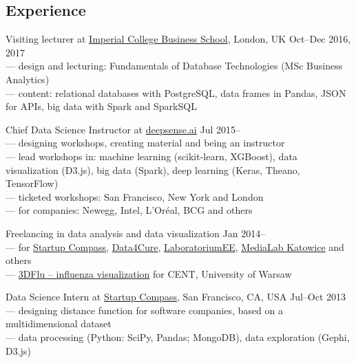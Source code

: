 \documentclass[margin,line]{resume}
\begin{document}
\begin{resume}

    \section{\mysidestyle Experience}

    \begin{list2}

    \item Visiting lecturer at \href{https://wwwf.imperial.ac.uk/business-school/}{Imperial College Business School}, London, UK \hfill Oct--Dec 2016, 2017\\
        --- design and lecturing: Fundamentals of Database Technologies (MSc Business Analytics)\\
        --- content: relational databases with PostgreSQL, data frames in Pandas, JSON for APIs, big data with Spark and SparkSQL

    \item Chief Data Science Instructor at \href{https://deepsense.ai/}{deepsense.ai} \hfill Jul 2015--\\
        --- designing workshops, creating material and being an instructor\\
        --- lead workshops in: machine learning (scikit-learn, XGBoost), data visualization (D3.js), big data (Spark), deep learning (Keras, Theano, TensorFlow)\\
        --- ticketed workshops: San Francisco, New York and London\\
        --- for companies: Newegg, Intel, L'Oréal, BCG and others

    \item Freelancing in data analysis and data visualization  \hfill Jan 2014--\\
        --- for \href{http://compass.co}{Startup Compass}, \href{http://www.data4cure.com/}{Data4Cure}, \href{https://laboratorium.ee/en}{LaboratoriumEE}, \href{https://medialabkatowice.eu/en/}{MediaLab Katowice} and others\\
        --- \href{http://nucleus3d.cent.uw.edu.pl/influenza/}{3DFlu -- influenza visualization} for CENT, University of Warsaw

    \item Data Science Intern at \href{http://compass.co}{Startup Compass}, San Francisco, CA, USA \hfill Jul--Oct 2013\\
        --- designing distance function for software companies, based on a multidimensional dataset\\
        --- data processing (Python: SciPy, Pandas; MongoDB), data exploration (Gephi, D3.js)


\end{list2}
\end{resume}
\end{document}
